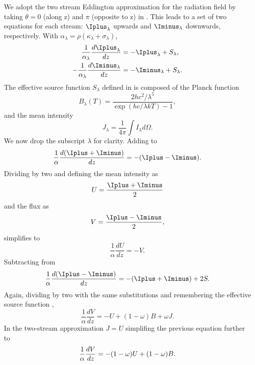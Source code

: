 We adopt the two stream Eddington approximation for the radiation field by taking $\theta = 0$ (along z) and $\pi$ (opposite to z) in . This leads to a set of two equations for each stream: $\Iplus_\lambda$ upwards and $\Iminus_\lambda$ downwards, respectively. With $\alpha_\lambda = \rho(\kappa_\lambda + \sigma_\lambda)$,
\begin{align} 
    \frac{1}{\alpha_\lambda}\frac{d\Iplus_\lambda}{dz} &= -\Iplus_\lambda + S_\lambda \label{eqn:dIpdz}, \\
    -\frac{1}{\alpha_\lambda}\frac{d\Iminus_\lambda}{dz} &= -\Iminus_\lambda + S_\lambda. \label{eqn:dImdz}
\end{align}
The effective source function $S_\lambda$ defined in  is composed of the Planck function
\begin{equation}
    B_{\lambda}(T) = \frac{2hc^2/\lambda^5}{\exp(hc/\lambda k T) - 1},
\end{equation}
and the mean intensity
\begin{equation}
    J_\lambda = \frac{1}{4\pi}\int I_\lambda d\Omega.
\end{equation}
We now drop the subscript $\lambda$ for clarity. Adding  to 
\begin{equation}\label{eqn:dIdz}
    \frac{1}{\alpha}\frac{d(\Iplus + \Iminus)}{dz} = - (\Iplus - \Iminus).
\end{equation}
Dividing by two and defining the mean intensity as 
\begin{equation}
    U = \frac{\Iplus + \Iminus}{2}
\end{equation}
and the flux as
\begin{equation}
    V = \frac{\Iplus - \Iminus}{2},
\end{equation}
 simplifies to
\begin{equation}\label{eqn:dUdz=-V}
    \frac{1}{\alpha}\frac{dU}{dz} = -V.
\end{equation}
Subtracting  from 
\begin{equation}
    \frac{1}{\alpha}\frac{d(\Iplus - \Iminus)}{dz} = - (\Iplus + \Iminus) + 2S.
\end{equation}
Again, dividing by two with the same substitutions and remembering the effective source function ,
\begin{equation}
    \frac{1}{\alpha}\frac{dV}{dz} = -U + (1-\omega) B + \omega J.
\end{equation}
In the two-stream approximation $J=U$ simplifing the previous equation further to
\begin{equation}
    \frac{1}{\alpha}\frac{dV}{dz} = -(1-\omega) U + (1-\omega) B. \\
\end{equation}

